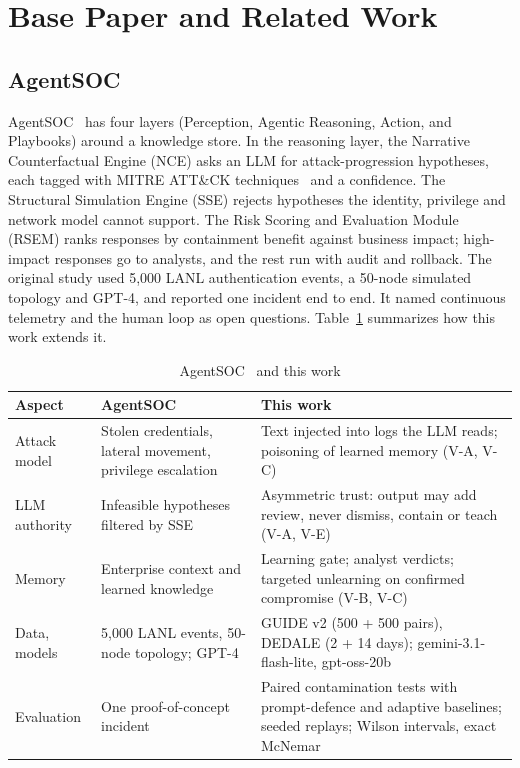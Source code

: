 \documentclass[conference]{IEEEtran}
\begin{document}
\section{Base Paper and Related Work}\label{sec:related}

\subsection{AgentSOC}

AgentSOC~\cite{agentsoc} has four layers (Perception, Agentic Reasoning, Action, and Playbooks) around a knowledge
store. In the reasoning layer, the Narrative Counterfactual Engine (NCE) asks an LLM for attack-progression
hypotheses, each tagged with MITRE ATT\&CK techniques~\cite{attack} and a confidence. The Structural Simulation
Engine (SSE) rejects hypotheses the identity, privilege and network model cannot support. The Risk Scoring and
Evaluation Module (RSEM) ranks responses by containment benefit against business impact; high-impact responses go
to analysts, and the rest run with audit and rollback. The original study used 5,000 LANL authentication events, a
50-node simulated topology and GPT-4, and reported one incident end to end. It named continuous telemetry and the
human loop as open questions. Table~\ref{tab:compare} summarizes how this work extends it.

\begin{table}[t]
\caption{AgentSOC~\cite{agentsoc} and this work}
\label{tab:compare}
\centering\scriptsize
\setlength{\tabcolsep}{2.5pt}
\begin{tabular}{@{}p{12mm}p{29mm}p{42mm}@{}}
\toprule
Aspect & AgentSOC~\cite{agentsoc} & This work \\
\midrule
Attack model & Stolen credentials, lateral movement, privilege escalation & Text injected into logs the LLM reads;
poisoning of learned memory (V-A, V-C) \\
LLM authority & Infeasible hypotheses filtered by SSE & Asymmetric trust: output may add review, never dismiss,
contain or teach (V-A, V-E) \\
Memory & Enterprise context and learned knowledge & Learning gate; analyst verdicts; targeted unlearning on
confirmed compromise (V-B, V-C) \\
Data, models & 5,000 LANL events, 50-node topology; GPT-4 & GUIDE v2 (500 + 500 pairs), DEDALE (2 + 14 days);
gemini-3.1-flash-lite, gpt-oss-20b \\
Evaluation & One proof-of-concept incident & Paired contamination tests with prompt-defence and adaptive
baselines; seeded replays; Wilson intervals, exact McNemar \\
\bottomrule
\end{tabular}
\end{table}
\end{document}
